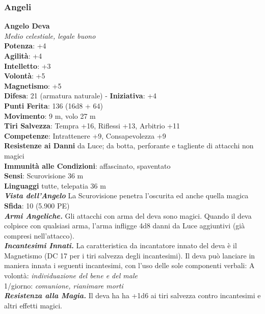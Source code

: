\begin{multicols}{2}
\subsubsection{Angeli}

\medskip\textbf{Angelo Deva}\\
\emph{Medio celestiale, legale buono}\\
\textbf{Potenza}: +4\\
\textbf{Agilità}: +4\\
\textbf{Intelletto}: +3\\
\textbf{Volontà}: +5\\
\textbf{Magnetismo}: +5\\
\textbf{Difesa}: 21 (armatura naturale) - \textbf{Iniziativa}: +4\\
\textbf{Punti Ferita}: 136 (16d8 + 64)\\
\textbf{Movimento}: 9 m, volo 27 m\\
\textbf{Tiri Salvezza}: Tempra +16, Riflessi +13, Arbitrio +11\\
\textbf{Competenze}: Intrattenere +9, Consapevolezza +9\\
\textbf{Resistenze ai Danni} da Luce; da botta, perforante e tagliente di attacchi non magici\\
\textbf{Immunità alle Condizioni}: affascinato, spaventato\\
\textbf{Sensi}: Scurovisione 36 m\\
\textbf{Linguaggi} tutte, telepatia 36 m\\
\emph{\textbf{Vista dell'Angelo}} La Scurovisione penetra l'oscurita ed anche quella magica\\
\textbf{Sfida}: 10 (5.900 PE)\smallskip\\
\emph{\textbf{Armi Angeliche.}} Gli attacchi con arma del deva sono magici. Quando il deva colpisce con qualsiasi arma, l'arma infligge 4d8 danni da Luce aggiuntivi (già compresi nell'attacco).\\
\emph{\textbf{Incantesimi Innati.}} La caratteristica da incantatore innato del deva è il Magnetismo (DC 17 per i tiri salvezza degli incantesimi). Il deva può lanciare in maniera innata i seguenti incantesimi, con l'uso delle sole componenti verbali: 
A volontà: \emph{individuazione del bene e del male}\\
1/giorno: \emph{comunione, rianimare morti}\\
\emph{\textbf{Resistenza alla Magia.}} Il deva ha ha +1d6 ai tiri salvezza contro incantesimi e altri effetti magici.\\

\end{multicols}
